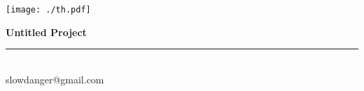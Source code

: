 \documentclass[11pt]{article}
\newcommand{\HRule}{\rule{\linewidth}{0.5mm}}
\begin{document}
\thispagestyle{empty}
\begin{minipage}{0.12\textwidth}
\texttt{[image: ./th.pdf]}
\end{minipage}\hspace{1em}
\begin{minipage}{0.2\textwidth}
\end{minipage}
\begin{minipage}{0.8\textwidth}
{\Huge \bfseries Untitled Project}\\
\HRule\\
\Large slowdanger@gmail.com
\end{minipage}
\end{document}
